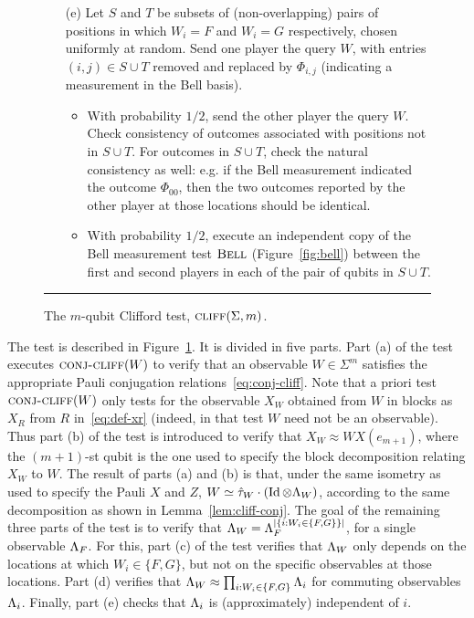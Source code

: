 \begin{figure}[H]
\begin{itemize}
\begin{enumerate}
\item[(e)] Let $S$ and $T$ be subsets of (non-overlapping) pairs of positions in which $W_i=F$ and $W_i=G$ respectively, chosen uniformly at random. Send one player the query $W$, with entries $(i,j) \in S\cup T$ removed and replaced by $\Phi_{i,j}$ (indicating a measurement in the Bell basis). 
\begin{itemize}
\item With probability $1/2$, send the other player the query $W$. Check consistency of outcomes associated with positions not in $S\cup T$. For outcomes in $S\cup T$, check the natural consistency as well: e.g. if the Bell measurement indicated the outcome $\Phi_{00}$, then the two outcomes reported by the other player at those locations should be identical. 
\item With probability $1/2$, execute an independent copy of the Bell measurement test $\textsc{Bell}$ (Figure~\ref{fig:bell}) between the first and second players in each of the pair of qubits in $S\cup T$. 
\end{itemize}
\end{enumerate}
\end{itemize}
\rule[2ex]{\textwidth}{0.5pt}\vspace{-.5cm}
\caption{The $m$-qubit Clifford test, $\textsc{cliff}(\Sigma,m)$.}
\label{fig:clifford-test-3}
\end{figure}

The test is described in Figure~\ref{fig:clifford-test-3}. It is divided in five
parts. Part (a) of the test executes  $\textsc{conj-cliff}(W)$ to verify that an observable
$W\in\Sigma^m$ satisfies the appropriate Pauli conjugation
relations~\eqref{eq:conj-cliff}. Note that a priori test $\textsc{conj-cliff}(W)$ only tests
for the observable $X_W$ obtained from $W$ in blocks as $X_R$ from $R$
in~\eqref{eq:def-xr} (indeed, in that test $W$ need not be an observable). Thus
part (b) of the test is introduced to verify that $X_W \approx W X(e_{m+1})$, where the $(m+1)$-st qubit is the one used to specify the block decomposition relating $X_W$ to $W$.  The result of parts (a) and (b) is that, under the same isometry as used to specify the Pauli $X$ and $Z$, $W\simeq \hat{\tau}_W \cdot (\mathop{\rm Id}\nolimits\otimes \Lambda_W)$, according to the same decomposition as shown in Lemma~\ref{lem:cliff-conj}. The goal of the remaining three parts of the test is to verify that $\Lambda_W = \Lambda_F^{|\{i: W_i \in \{F,G\}\}|}$, for a single observable $\Lambda_F$. For this, part (c) of the test verifies that $\Lambda_W$ only depends on the locations at which $W_i\in\{F,G\}$, but not on the specific observables at those locations. Part (d) verifies that $\Lambda_W \approx \prod_{i: W_i\in \{F,G\}} \Lambda_i $ for commuting observables $\Lambda_i$. Finally, part (e) checks that $\Lambda_i$ is (approximately) independent of $i$. 

